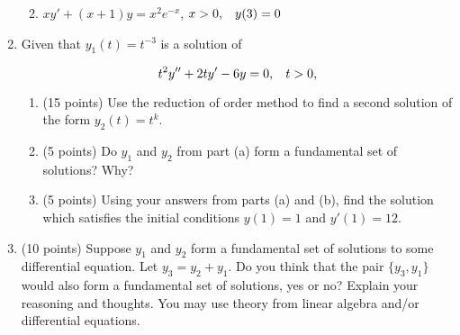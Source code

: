 \documentclass[11pt]{exam}
\begin{document}
\begin{enumerate}
\begin{enumerate}
	\setcounter{enumii}{1}
	\item $xy'+(x+1)y=x^2e^{-x}$, \hspace{.2cm} $x>0,  \hspace{.3cm} y(3)=0$\\
\end{enumerate}

\newpage

\item Given that $y_1(t)=t^{-3}$ is a solution of 

$$t^2y''+2ty'-6y=0, \hspace{.3cm} t>0,$$

\begin{enumerate}
	\item (15 points) Use the reduction of order method to find a second solution of the form $y_2(t)=t^k$.\\
	
\newpage
	
	\item (5 points) Do $y_1$ and $y_2$ from part (a) form a fundamental set of solutions? Why?
	
\newpage
	
	\item (5 points) Using your answers from parts (a) and (b), find the solution which satisfies the initial conditions $y(1)=1$ and $y'(1)=12$.\\
	
\end{enumerate}

\newpage

	\item (10 points) Suppose $y_1$ and $y_2$ form a fundamental set of solutions to some differential equation. Let $y_3=y_2+y_1$. Do you think that the pair $\{y_3,y_1\}$ would also form a fundamental set of solutions, yes or no? Explain your reasoning and thoughts. You may use theory from linear algebra and/or differential equations.\\

\end{enumerate}



















 
\end{document}
